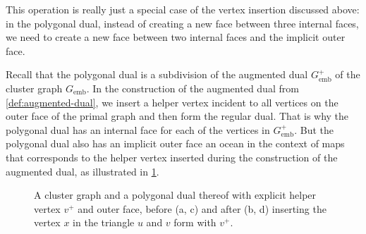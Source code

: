 This operation is really just a special case of the vertex insertion discussed above: in the polygonal dual, instead of creating a new face between three internal faces, we need to create a new face between two internal faces and the implicit outer face.

Recall that the polygonal dual is a subdivision of the augmented dual $G_\text{emb}^+$ of the cluster graph $G_\text{emb}$. In the construction of the augmented dual from \cref{def:augmented-dual}, we insert a helper vertex incident to all vertices on the outer face of the primal graph and then form the regular dual. That is why the polygonal dual has an internal face for each of the vertices in $G_\text{emb}^+$. But the polygonal dual also has an implicit outer face \emdash{} an ocean in the context of maps \emdash{} that corresponds to the helper vertex inserted during the construction of the augmented dual, as illustrated in \cref{fig:insert-vertex-duality}.

\begin{figure}[H]
	\centering
	\quad
	\qquad
	\quad
	\caption{A cluster graph and a polygonal dual thereof with explicit helper vertex $v^+$ and outer face, before (a, c) and after (b, d) inserting the vertex $x$ in the triangle $u$ and $v$ form with $v^+$.}
	\label{fig:insert-vertex-duality}
\end{figure}

